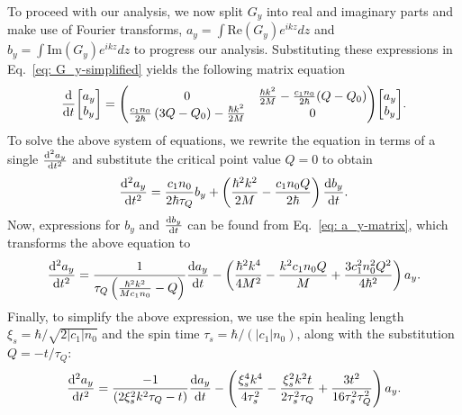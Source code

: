 To proceed with our analysis, we now split \(G_y\) into real and imaginary parts
and make use of Fourier transforms, \(a_y=\int \text{Re}(G_y)e^{ikz} dz\) and
\(b_y=\int \text{Im}(G_y)e^{ikz} dz\) to progress our analysis.
Substituting these expressions in Eq.~\eqref{eq: G_y-simplified} yields the
following matrix equation
\begin{align}\label{eq: a_y-matrix}
    \dv{t}\mqty[a_y \\ b_y] = \mqty(0 & \frac{\hbar k^2}{2M}
    - \frac{c_1  n_0}{2\hbar}(Q - Q_0) \\
    \frac{c_1  n_0}{2\hbar} \left( 3Q-Q_0 \right)-\frac{\hbar k^2}{2M} & 0)
    \mqty[a_y \\ b_y].
 \end{align}
To solve the above system of equations, we rewrite the equation in terms of a
single \(\dv[2]{a_y}{t}\) and substitute the critical point value \(Q=0\) to
obtain
\begin{align}
    \dv[2]{a_y}{t} = \frac{c_1n_0}{2\hbar\tau_Q}b_y
    + \left(\frac{\hbar^2k^2}{2M} - \frac{c_1n_0Q}{2\hbar}\right)\dv{b_y}{t}.
\end{align}
Now, expressions for \(b_y\) and \(\dv{b_y}{t}\) can be found from
Eq.~\eqref{eq: a_y-matrix}, which transforms the above equation to
\begin{align}
    \dv[2]{a_y}{t} = \frac{1}{\tau_Q\left(\frac{\hbar^2k^2}{Mc_1n_0}
    - Q\right)}\dv{a_y}{t}
    - \left(\frac{\hbar^2k^4}{4M^2} - \frac{k^2c_1n_0Q}{M}
    + \frac{3c_1^2n_0^2Q^2}{4\hbar^2}\right)a_y.
\end{align}
Finally, to simplify the above expression, we use the spin healing length
\(\xi_s = \hbar/\sqrt{2|c_1|n_0}\) and the spin time
\(\tau_s=\hbar/(|c_1|n_0)\), along with the substitution \(Q=-t/\tau_Q\):
\begin{align}
  \dv[2]{a_y}{t} = \frac{-1}{\left(2\xi_s^2 k^2 \tau_Q- t \right)}\dv{a_y}{t}
  -\left( \frac{\xi_s^4 k^4}{4\tau_s^2} -\frac{\xi_s^2 k^2 t}{2\tau_s^2 \tau_Q}
  + \frac{3 t^2}{16\tau_s^2 \tau_Q^2} \right) a_y.
\end{align}

